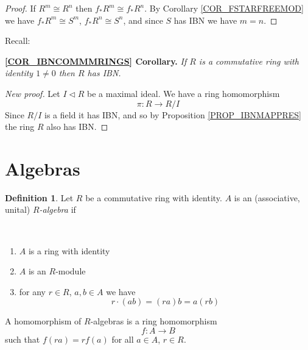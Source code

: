 \documentclass[12pt, letterpaper, oneside]{article}
\theoremstyle{plain}
\theoremstyle{definition}
\newtheorem{definition}[theorem]{Definition}
\newcommand{\benu}{\begin{enumerate}}
\newcommand{\eenu}{\end{enumerate}}
\newcommand{\vs}{\vskip 5mm}
\newcommand{\isep}[1][0]{\setlength{\itemsep}{#1 mm}}
\begin{document}
\vs

\begin{proof}
If $R^{m}\cong R^{n}$ then $f_{\ast}R^{m}\cong f_{\ast}R^{n}$. By Corollary \ref{COR_FSTARFREEMOD}
we have $f_{\ast}R^{m}\cong S^{m}$, $f_{\ast}R^{n}\cong S^{n}$, and since $S$ has IBN we have 
$m=n$.
\end{proof}


\vs\vs

Recall:

\textbf{\ref{COR_IBNCOMMMRINGS} Corollary.} \emph{If $R$ is a commutative ring with identity $1\neq 0$ then $R$ has  IBN.}

\vs

\begin{proof}[New proof]
Let $I\lhd R$ be a maximal ideal. We have a ring homomorphism
$$\pi\colon R \to R/I$$
Since $R/I$ is a field it has IBN, and so by Proposition \ref{PROP_IBNMAPPRES}  the ring $R$
also has IBN. 
\end{proof}


















\newpage
\section{Algebras}
\label{SEC_ALGEBRAS}

\begin{definition}
Let $R$ be a commutative ring with identity. $A$ is an (associative, unital) 
\emph{$R$-algebra} if 


\vskip -13mm 

\ 
\benu
\isep[0]
\item $A$ is a ring with identity
\item $A$ is an $R$-module
\item for any $r\in R$, $a, b\in A$ we have 
$$r\cdot(ab) = (ra)b = a(rb)$$
\eenu 

A homomorphism of $R$-algebras is a ring homomorphism 
$$f\colon A \to B$$
such that $f(ra) = rf(a)$ for all $a\in A$, $r\in R$.

\end{definition}
\end{document}

